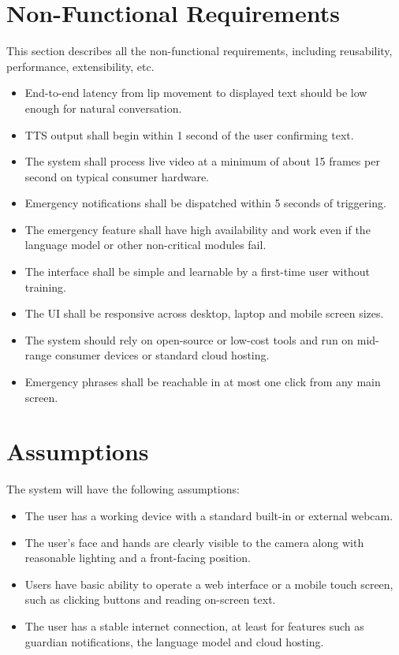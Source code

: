 \documentclass{FastFyp}
\begin{document}
\section{Non-Functional Requirements}
This section describes all the non-functional requirements, including reusability, performance, extensibility, etc.
\begin{itemize}
  \item End-to-end latency from lip movement to displayed text should be low enough for natural conversation.
  \item TTS output shall begin within 1 second of the user confirming text.
  \item The system shall process live video at a minimum of about 15 frames per second on typical consumer hardware.
  \item Emergency notifications shall be dispatched within 5 seconds of triggering.
  \item The emergency feature shall have high availability and work even if the language model or other non-critical modules fail.
  \item The interface shall be simple and learnable by a first-time user without training.
  \item The UI shall be responsive across desktop, laptop and mobile screen sizes.
  \item The system should rely on open-source or low-cost tools and run on mid-range consumer devices or standard cloud hosting.
  \item Emergency phrases shall be reachable in at most one click from any main screen.
\end{itemize}

\section{Assumptions}
The system will have the following assumptions:
\begin{itemize}
  \item The user has a working device with a standard built-in or external webcam.
  \item The user's face and hands are clearly visible to the camera along with reasonable lighting and a front-facing position.
  \item Users have basic ability to operate a web interface or a mobile touch screen, such as clicking buttons and reading on-screen text.
  \item The user has a stable internet connection, at least for features such as guardian notifications, the language model and cloud hosting.
\end{itemize}
\end{document}
